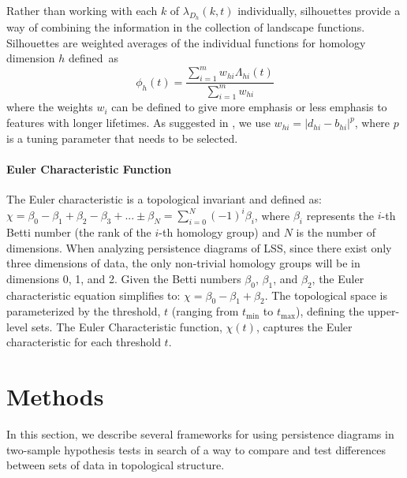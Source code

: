 \documentclass[12pt]{article}
\begin{document}
Rather than working with each $k$ of $\lambda_{D_h}(k, t)$ individually, silhouettes provide a way of combining the information in the collection of landscape functions.  Silhouettes are weighted averages of the individual functions for homology dimension $h$ defined~as
%
\begin{equation*}
\phi_h(t) = \frac{\sum_{i = 1}^mw_{hi}\Lambda_{hi}(t)}{\sum_{i = 1}^mw_{hi}}
\end{equation*}
where the weights $w_i$ can be defined to give more emphasis or less emphasis to features with longer lifetimes.  As suggested in \citep{chazal2014stochastic}, we use $w_{hi} = |d_{hi} - b_{hi}|^p$, where $p$ is a tuning parameter that needs to be selected.

\paragraph{Euler Characteristic Function}
The Euler characteristic is a topological invariant and defined as: $\chi = \beta_{0} - \beta_{1} + \beta_{2} - \beta_{3} + ... \pm \beta_N = \sum_{i=0}^{N} (-1)^{i} \beta_{i}$,
where $\beta_{i}$ represents the $i$-th Betti number (the rank of the $i$-th homology group) and $N$ is the number of dimensions. When analyzing persistence diagrams of LSS, since there exist only three dimensions of data, the only non-trivial homology groups will be in dimensions 0, 1, and 2. Given the Betti numbers $\beta_{0}$, $\beta_{1}$, and $\beta_{2}$, the Euler characteristic equation simplifies to:
$\chi = \beta_{0} - \beta_{1} + \beta_{2}.$
The topological space is parameterized by the threshold, $t$ (ranging from $t_{\min}$ to $t_{\max}$), defining the upper-level sets. The Euler Characteristic function, $\chi(t)$, captures the Euler characteristic for each threshold $t$.


\section{Methods}
\label{sec:methods}
In this section, we describe several frameworks for using persistence diagrams in two-sample hypothesis tests in search of a way to compare and test differences between sets of data in topological structure.
\end{document}
